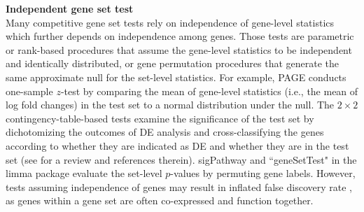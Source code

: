 \documentclass[useAMS,usenatbib, galley]{biom}
\newcommand{\gen}{geneSetTest}
\begin{document}
	
	\textbf{Independent gene set test} \\
	Many competitive gene set tests rely on independence of gene-level statistics which further depends on independence among genes. Those tests are parametric or rank-based procedures that assume the gene-level statistics to be independent and identically distributed, or gene permutation procedures that generate the same approximate null for the set-level statistics. For example, PAGE  \citep{kim2005page} conducts one-sample $z$-test by comparing the mean of gene-level statistics (i.e., the mean of log fold changes) in the test set to a normal distribution under the null. The $2\times 2$ contingency-table-based tests examine the significance of the test set by dichotomizing the outcomes of DE analysis and cross-classifying the genes according to whether they are indicated as DE and whether they are in the test set (see \cite{huang2009bioinformatics} for a review and references therein). sigPathway \citep{tian2005discovering} and ``\gen" in the limma package \citep{Smyth2004moderated} evaluate the set-level $p$-values by permuting gene labels. However, tests assuming independence of genes may result in inflated false discovery rate \citep{efron2007testing,goeman2007analyzing, gatti2010heading,wu2012camera,yaari2013quantitative}, as genes within a gene set are often co-expressed and function together.
	
\end{document}
